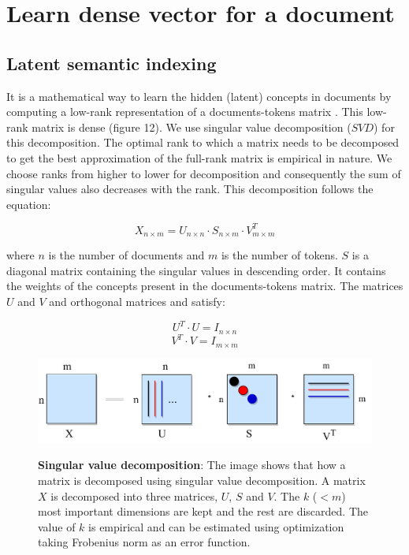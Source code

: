 \section{Learn dense vector for a document}
\subsection{Latent semantic indexing}
    It is a mathematical way to learn the hidden (latent) concepts in documents by computing a low-rank representation of a documents-tokens matrix \cite{Foltz1996, Shapiro2000, Landauer1998}. This low-rank matrix is dense (figure 12). We use singular value decomposition ($SVD$) for this decomposition. The optimal rank to which a matrix needs to be decomposed to get the best approximation of the full-rank matrix is empirical in nature. We choose ranks from higher to lower for decomposition and consequently the sum of singular values also decreases with the rank. This decomposition follows the equation:
    
    \begin{equation}
    X_{n \times m} = U_{n \times n} \cdot S_{n \times m} \cdot V_{m \times m}^T
    \end{equation}
    
    where $n$ is the number of documents and $m$ is the number of tokens. $S$ is a diagonal matrix containing the singular values in descending order. It contains the weights of the concepts present in the documents-tokens matrix. The matrices $U$ and $V$ and orthogonal matrices and satisfy:
    
    \begin{equation}
    U^T \cdot U = I_{n \times n}
    \end{equation}
    \begin{equation}
    V^T \cdot V = I_{m \times m}
    \end{equation}
    
\begin{figure}[h]
\begin{centering}
    {\includegraphics[scale=0.7]{figures/usv.pdf}}
    \caption[Pictorial representation of singular value decomposition]{\textbf{Singular value decomposition}: The image shows that how a matrix is decomposed using singular value decomposition. A matrix $X$ is decomposed into three matrices, $U$, $S$ and $V$. The $k$ ($<m$) most important dimensions are kept and the rest are discarded. The value of $k$ is empirical and can be estimated using optimization taking Frobenius norm as an error function.}
\end{centering}
\end{figure}

